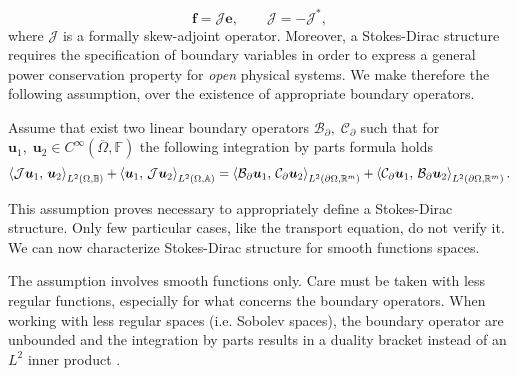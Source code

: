 \begin{equation}\label{eq:stdir}
\bm{f} =\mathcal{J}\bm{e}, \qquad \mathcal{J}= -\mathcal{J}^*,
\end{equation}
where $\mathcal{J}$ is a formally skew-adjoint operator. Moreover, a Stokes-Dirac structure requires the specification of boundary variables in order to express a general power  conservation  property  for \textit{open} physical  systems. We make therefore the following assumption, over the existence of appropriate boundary operators.

\begin{assumption}
	\label{ass:bdoper}
	Assume that exist two linear boundary operators $\mathcal{B}_\partial, \; \mathcal{C}_\partial$ such that for $\bm{u}_1, \; \bm{u}_2 \in C^\infty(\overline{\Omega}, \mathbb{F})$ the following integration by parts formula holds
	\begin{equation}\label{eq:intbypartsJ}
	\inner[L^2(\Omega, \bbB)]{\mathcal{J}\bm{u}_1}{\bm{u}_2} + \inner[L^2(\Omega, \bbA)]{\bm{u}_1}{\mathcal{J}\bm{u}_2} = \inner[L^2(\partial\Omega, \bbR^m)]{\mathcal{B}_\partial \bm{u}_1}{\mathcal{C}_\partial \bm{u}_2} + \inner[L^2(\partial\Omega, \bbR^m)]{\mathcal{C}_\partial \bm{u}_1}{\mathcal{B}_\partial \bm{u}_2}.
	\end{equation}

\end{assumption}

This assumption proves necessary to appropriately define a Stokes-Dirac structure. Only few particular cases, like the transport equation, do not verify it. We can now characterize Stokes-Dirac structure for smooth functions spaces.

\begin{remark}
	The assumption involves smooth functions only. Care must be taken with less regular functions, especially for what concerns the boundary operators. When working with less regular spaces (i.e. Sobolev spaces), the boundary operator are unbounded and the integration by parts results in a duality bracket instead of an $L^2$ inner product \cite[Chapter 4]{tucsnak2009observation}.
\end{remark}

